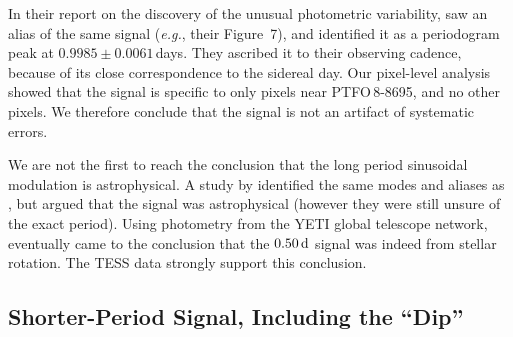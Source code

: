 \documentclass[12pt,twocolumn,tighten]{aastex62}
\newcommand{\ptfo}{PTFO$\,$8-8695}
\begin{document}
In their report on the discovery of the unusual
photometric variability, \citet{van_eyken_ptf_2012} saw an alias of the
same signal ({\it e.g.}, their Figure~7),
and identified it as a
periodogram peak at $0.9985 \pm 0.0061\,$days. They ascribed it to
their observing cadence, because of its close correspondence to the
sidereal day.
Our
pixel-level analysis showed that the signal is specific to only pixels
near \ptfo, and no other pixels.  We therefore conclude that the
signal is not an artifact of systematic errors.

We are not the first to reach the conclusion that the long period
sinusoidal modulation is astrophysical.  A study by
\citet{koen_multicolour_2015} identified the same modes and aliases as
\citet{van_eyken_ptf_2012}, but argued that the signal was
astrophysical (however they were still unsure of the exact period).
Using photometry from the YETI global telescope network,
\citet{raetz_yeti_2016} eventually came to the conclusion that the
$0.50\,{\rm d}$ signal was indeed from stellar rotation.  The TESS
data strongly support this conclusion.



\subsection{Shorter-Period Signal, Including the ``Dip''}
\end{document}
